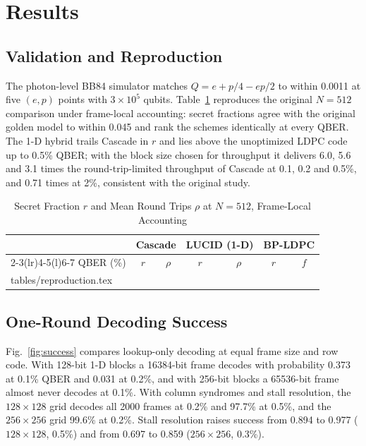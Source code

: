 \documentclass[conference]{IEEEtran}
\makeatletter
\newcommand{\tablerows}[1]{\@@input #1 }
\makeatother
\begin{document}
\section{Results}\label{sec:results}

\subsection{Validation and Reproduction}
The photon-level BB84 simulator matches $Q=e+p/4-ep/2$ to within 0.0011 at five $(e,p)$ points with $3\times10^{5}$ qubits. Table~\ref{tab:repro} reproduces the original $N=512$ comparison under frame-local accounting: secret fractions agree with the original golden model to within 0.045 and rank the schemes identically at every QBER. The 1-D hybrid trails Cascade in $r$ and lies above the unoptimized LDPC code up to 0.5\% QBER; with the block size chosen for throughput it delivers 6.0, 5.6 and 3.1 times the round-trip-limited throughput of Cascade at 0.1, 0.2 and 0.5\%, and 0.71 times at 2\%, consistent with the original study.

\begin{table}[t]
\caption{Secret Fraction $r$ and Mean Round Trips $\rho$ at $N=512$, Frame-Local Accounting}
\label{tab:repro}
\centering
\setlength{\tabcolsep}{4pt}
\begin{tabular}{@{}lcccccc@{}}
\toprule
& \multicolumn{2}{c}{Cascade} & \multicolumn{2}{c}{LUCID (1-D)} & \multicolumn{2}{c}{BP-LDPC}\\
\cmidrule(lr){2-3}\cmidrule(lr){4-5}\cmidrule(l){6-7}
QBER (\%) & $r$ & $\rho$ & $r$ & $\rho$ & $r$ & $f$\\
\midrule
\tablerows{tables/reproduction.tex}
\bottomrule
\end{tabular}
\end{table}

\subsection{One-Round Decoding Success}
Fig.~\ref{fig:success} compares lookup-only decoding at equal frame size and row code. With 128-bit 1-D blocks a 16384-bit frame decodes with probability 0.373 at 0.1\% QBER and 0.031 at 0.2\%, and with 256-bit blocks a 65536-bit frame almost never decodes at 0.1\%. With column syndromes and stall resolution, the $128\times128$ grid decodes all 2000 frames at 0.2\% and 97.7\% at 0.5\%, and the $256\times256$ grid 99.6\% at 0.2\%. Stall resolution raises success from 0.894 to 0.977 ($128\times128$, 0.5\%) and from 0.697 to 0.859 ($256\times256$, 0.3\%).
\end{document}
